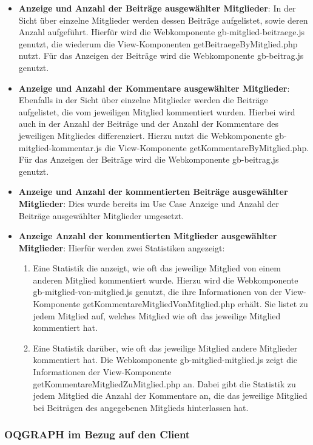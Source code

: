\begin{itemize}
	\item \textbf{Anzeige und Anzahl der Beiträge ausgewählter Mitglieder}: In der Sicht über einzelne Mitglieder werden dessen Beiträge aufgelistet, sowie deren Anzahl aufgeführt. Hierfür wird die Webkomponente \grqq gb-mitglied-beitraege.js\grqq{} genutzt, die wiederum die View-Komponenten \grqq getBeitraegeByMitglied.php\grqq{} nutzt. Für das Anzeigen der Beiträge wird die Webkomponente \grqq gb-beitrag.js\grqq{} genutzt.
	\item \textbf{Anzeige und Anzahl der Kommentare ausgewählter Mitglieder}: Ebenfalls in der Sicht über einzelne Mitglieder werden die Beiträge aufgelistet, die vom jeweiligen Mitglied kommentiert wurden. Hierbei wird auch in der Anzahl der Beiträge und der Anzahl der Kommentare des jeweiligen Mitgliedes differenziert. Hierzu nutzt die Webkomponente \grqq gb-mitglied-kommentar.js\grqq{} die View-Komponente \grqq getKommentareByMitglied.php\grqq{}. Für das Anzeigen der Beiträge wird die Webkomponente \grqq gb-beitrag.js\grqq{} genutzt.
	\item \textbf{Anzeige und Anzahl der kommentierten Beiträge ausgewählter Mitglieder}: Dies wurde bereits im Use Case \grqq Anzeige und Anzahl der Beiträge ausgewählter Mitglieder\grqq{} umgesetzt.
	\item \textbf{Anzeige Anzahl der kommentierten Mitglieder ausgewählter Mitglieder}: Hierfür werden zwei Statistiken angezeigt:
	\begin{enumerate}
		\item Eine Statistik die anzeigt, wie oft das jeweilige Mitglied von einem anderen Mitglied kommentiert wurde. Hierzu wird die Webkomponente \grqq gb-mitglied-von-mitglied.js\grqq{} genutzt, die ihre Informationen von der View-Komponente \grqq getKommentareMitgliedVonMitglied.php\grqq{} erhält. Sie listet zu jedem Mitglied auf, welches Mitglied wie oft das jeweilige Mitglied kommentiert hat.
		\item Eine Statistik darüber, wie oft das jeweilige Mitglied andere Mitglieder kommentiert hat. Die Webkomponente \grqq gb-mitglied-mitglied.js\grqq{} zeigt die Informationen der View-Komponente \grqq getKommentareMitgliedZuMitglied.php\grqq{} an. Dabei gibt die Statistik zu jedem Mitglied die Anzahl der Kommentare an, die das jeweilige Mitglied bei Beiträgen des angegebenen Mitglieds hinterlassen hat.
	\end{enumerate}
\end{itemize}

\subsubsection{OQGRAPH im Bezug auf den Client}\label{OQGRAPH-Client}

